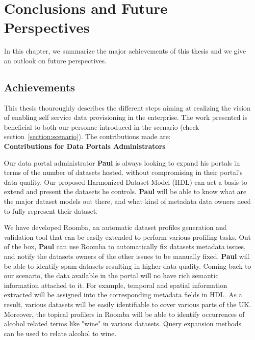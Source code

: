 \chapter{Conclusions and Future Perspectives}  \label{ch:conclusion}
\graphicspath{{conclusions/figures/}}

In this chapter, we summarize the major achievements of this thesis and we give an outlook on future perspectives.

\section{Achievements}

This thesis thouroughly describes the different steps aiming at realizing the vision of enabling self service data provisioning in the enterprise. The work presented is beneficial to both our personae introduced in the scenario (check section~\ref{section:scenario}). The contributions made are:\\

\textbf{Contributions for Data Portals Administrators}
\vspace{1mm}

Our data portal administrator \textbf{Paul} is always looking to expand his portals in terms of the number of datasets hosted, without compromising in their portal's data quality. Our proposed Harmonized Dataset Model (HDL) can act a basis to extend and present the datasets he controls. \textbf{Paul} will be able to know what are the major dataset models out there, and what kind of metadata data owners need to fully represent their dataset.

We have developed Roomba, an automatic dataset profiles generation and validation tool that can be easily extended to perform various profiling tasks. Out of the box, \textbf{Paul} can use Roomba to automatically fix datasets metadata issues, and notify the datasets owners of the other issues to be manually fixed. \textbf{Paul} will be able to identify spam datasets resulting in higher data quality. Coming back to our scenario, the data available in the portal will no have rich semantic information attached to it. For example, temporal and spatial information extracted will be assigned into the corresponding metadata fields in HDL. As a result, various datasets will be easily identifiable to cover various parts of the UK. Moreover, the topical profilers in Roomba will be able to identify occurrences of alcohol related terms like "wine" in various datasets. Query expansion methods can be used to relate alcohol to wine.\\

